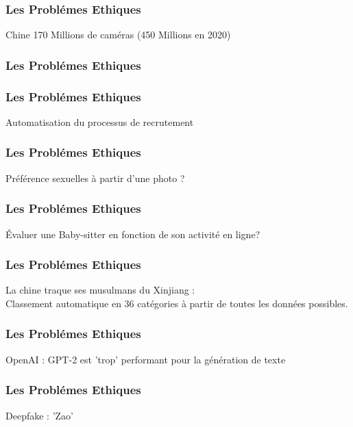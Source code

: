 \begin{frame}
  \frametitle{Les Problémes Ethiques}
  Chine 170 Millions de caméras (450 Millions en 2020)
  \begin{minipage}[c]{0.49\linewidth}
  \end{minipage}\hfill
  \begin{minipage}[c]{0.49\linewidth}
  \end{minipage}\hfill
\end{frame}

\begin{frame}
  \frametitle{Les Problémes Ethiques}
\end{frame}

\begin{frame}
  \frametitle{Les Problémes Ethiques}
  Automatisation du processus de recrutement
\end{frame}

\begin{frame}
  \frametitle{Les Problémes Ethiques}
  Préférence sexuelles à partir d'une photo ?
\end{frame}

\begin{frame}
  \frametitle{Les Problémes Ethiques}
  Évaluer une Baby-sitter en fonction de son activité en ligne?
\end{frame}

\begin{frame}
  \frametitle{Les Problémes Ethiques}
  La chine traque ses musulmans du Xinjiang :\\
  Classement automatique en 36 catégories à partir de toutes les données possibles.
\end{frame}

\begin{frame}
  \frametitle{Les Problémes Ethiques}
  OpenAI : GPT-2 est 'trop' performant pour la génération de texte
\end{frame}

\begin{frame}
  \frametitle{Les Problémes Ethiques}
  Deepfake : 'Zao'
\end{frame}
